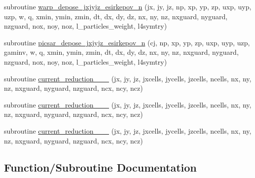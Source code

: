 \begin{DoxyCompactItemize}
\item 
subroutine \hyperlink{current__deposition_8_f90_af8faa4a1c6a61774bcfddd4519751c41}{warp\+\_\+depose\+\_\+jxjyjz\+\_\+esirkepov\+\_\+n} (jx, jy, jz, np, xp, yp, zp, uxp, uyp, uzp, w, q, xmin, ymin, zmin,                                                                                                                                                                                               dt, dx, dy, dz, nx, ny, nz, nxguard, nyguard, nzguard,                                                                                                                                                                                               nox, noy, noz, l\+\_\+particles\+\_\+weight, l4symtry)
\item 
subroutine \hyperlink{current__deposition_8_f90_ab2df44ab280a4669e4432d4538e70c79}{picsar\+\_\+depose\+\_\+jxjyjz\+\_\+esirkepov\+\_\+n} (cj, np, xp, yp, zp, uxp, uyp, uzp, gaminv, w, q, xmin, ymin, zmin,                                                                                                                                                                                               dt, dx, dy, dz, nx, ny, nz, nxguard, nyguard, nzguard,                                                                                                                                                                                               nox, noy, noz, l\+\_\+particles\+\_\+weight, l4symtry)
\item 
subroutine \hyperlink{current__deposition_8_f90_a7fc8e2e07f2c45b26fa3388a9e519c4e}{current\+\_\+reduction\+\_\+\_\+\_} (jx, jy, jz, jxcells, jycells, jzcells, ncells, nx, ny, nz, nxguard, nyguard, nzguard, ncx, ncy, ncz)
\item 
subroutine \hyperlink{current__deposition_8_f90_a4a6549c8cf282fb4e1818da1e6696fe1}{current\+\_\+reduction\+\_\+\_\+\_} (jx, jy, jz, jxcells, jycells, jzcells, ncells, nx, ny, nz, nxguard, nyguard, nzguard, ncx, ncy, ncz)
\item 
subroutine \hyperlink{current__deposition_8_f90_a1c3d937e970b554b85e71cb31e708636}{current\+\_\+reduction\+\_\+\_\+\_} (jx, jy, jz, jxcells, jycells, jzcells, ncells,                                                                                                                                   nx, ny, nz, nxguard, nyguard, nzguard, ncx, ncy, ncz)
\end{DoxyCompactItemize}


\subsection{Function/\+Subroutine Documentation}
